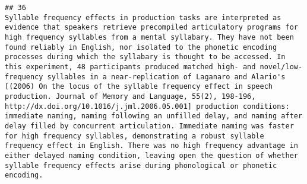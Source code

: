 \documentclass[
  english,
  man]{apa6}
\begin{document}
\begin{verbatim}
## 36                                                                                                                                                                                                                                                                                                                                                                                                                                                                                                                                                                                                                                                                                                                                                                                                                                                                                                                                                                                                                                                                                                                                                                                                                                                                                                                                                                                                                                                                                                                                                Syllable frequency effects in production tasks are interpreted as evidence that speakers retrieve precompiled articulatory programs for high frequency syllables from a mental syllabary. They have not been found reliably in English, nor isolated to the phonetic encoding processes during which the syllabary is thought to be accessed. In this experiment, 48 participants produced matched high- and novel/low-frequency syllables in a near-replication of Laganaro and Alario's [(2006) On the locus of the syllable frequency effect in speech production. Journal of Memory and Language, 55(2), 198-196, http://dx.doi.org/10.1016/j.jml.2006.05.001] production conditions: immediate naming, naming following an unfilled delay, and naming after delay filled by concurrent articulation. Immediate naming was faster for high frequency syllables, demonstrating a robust syllable frequency effect in English. There was no high frequency advantage in either delayed naming condition, leaving open the question of whether syllable frequency effects arise during phonological or phonetic encoding.

\end{verbatim}
\end{document}
